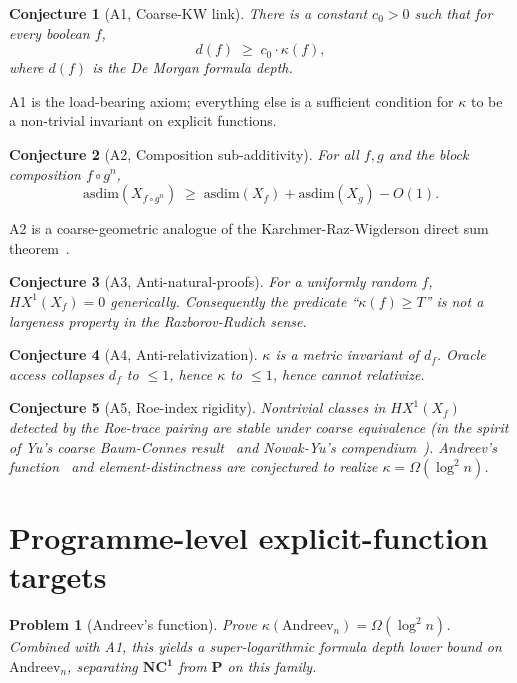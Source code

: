 \documentclass[11pt,a4paper]{article}
\newtheorem{conjecture}{Conjecture}
\newtheorem{problem}{Problem}
\begin{document}
\begin{conjecture}[A1, Coarse-KW link]\label{ax:A1}
There is a constant $c_0 > 0$ such that for every boolean $f$,
\[
d(f) \;\geq\; c_0 \cdot \kappa(f),
\]
where $d(f)$ is the De Morgan formula depth.
\end{conjecture}

A1 is the load-bearing axiom; everything else is a sufficient condition
for $\kappa$ to be a non-trivial invariant on explicit functions.

\begin{conjecture}[A2, Composition sub-additivity]\label{ax:A2}
For all $f, g$ and the block composition $f \circ g^n$,
\[
\mathrm{asdim}(X_{f \circ g^n})
\;\geq\;
\mathrm{asdim}(X_f) + \mathrm{asdim}(X_g) - O(1).
\]
\end{conjecture}

A2 is a coarse-geometric analogue of the
Karchmer-Raz-Wigderson direct sum theorem~\cite{KarchmerRazWigderson1995}.

\begin{conjecture}[A3, Anti-natural-proofs]\label{ax:A3}
For a uniformly random $f$, $HX^1(X_f) = 0$ generically. Consequently
the predicate ``$\kappa(f) \geq T$'' is not a largeness property in the
Razborov-Rudich sense.
\end{conjecture}

\begin{conjecture}[A4, Anti-relativization]\label{ax:A4}
$\kappa$ is a metric invariant of $d_f$. Oracle access collapses $d_f$
to $\leq 1$, hence $\kappa$ to $\leq 1$, hence cannot relativize.
\end{conjecture}

\begin{conjecture}[A5, Roe-index rigidity]\label{ax:A5}
Nontrivial classes in $HX^1(X_f)$ detected by the Roe-trace pairing are
stable under coarse equivalence (in the spirit of Yu's coarse Baum-Connes
result~\cite{Yu2000} and Nowak-Yu's compendium~\cite{NowakYu2012}).
Andreev's function~\cite{Andreev1987} and element-distinctness are
conjectured to realize $\kappa = \Omega(\log^2 n)$.
\end{conjecture}

\section{Programme-level explicit-function targets}\label{sec:targets}

\begin{problem}[Andreev's function]
Prove $\kappa(\mathrm{Andreev}_n) = \Omega(\log^2 n)$. Combined with A1,
this yields a super-logarithmic formula depth lower bound on
$\mathrm{Andreev}_n$, separating $\mathbf{NC^1}$ from
$\mathbf{P}$ on this family.
\end{problem}
\end{document}
